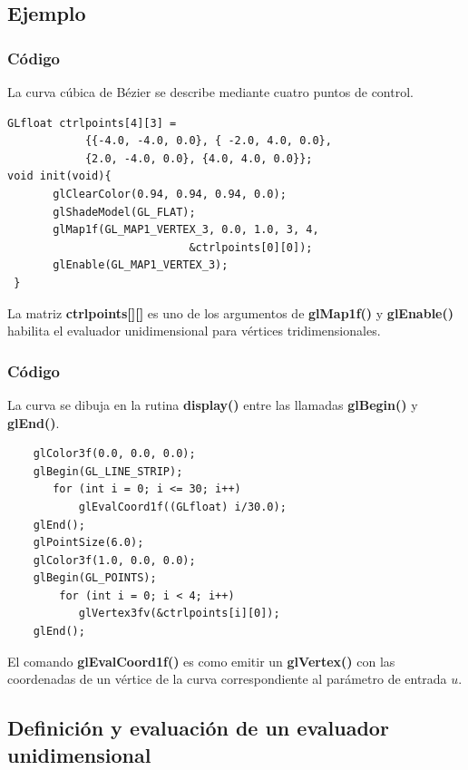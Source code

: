 \documentclass[10.5pt]{beamer}
\begin{document}
\subsection{Ejemplo}
\begin{frame}[fragile]
\justifying
\frametitle{Código}
La curva cúbica de Bézier se describe mediante cuatro puntos de control.
\begin{alertblock}{}
\small
\begin{verbatim}
GLfloat ctrlpoints[4][3] =
            {{-4.0, -4.0, 0.0}, { -2.0, 4.0, 0.0},
            {2.0, -4.0, 0.0}, {4.0, 4.0, 0.0}};
void init(void){
       glClearColor(0.94, 0.94, 0.94, 0.0);
       glShadeModel(GL_FLAT);
       glMap1f(GL_MAP1_VERTEX_3, 0.0, 1.0, 3, 4,
                            &ctrlpoints[0][0]);
       glEnable(GL_MAP1_VERTEX_3);
 }
\end{verbatim}
\end{alertblock}
La matriz \textbf{ctrlpoints[][]} es uno de los argumentos de \textbf{glMap1f()} y \textbf{glEnable()} habilita el evaluador unidimensional para vértices tridimensionales.
\end{frame}
\begin{frame}[fragile]
\frametitle{Código}
La curva se dibuja en la rutina \textbf{display()} entre las llamadas \textbf{glBegin()} y \textbf{glEnd()}.

\begin{alertblock}{}
\small
\begin{verbatim}
    glColor3f(0.0, 0.0, 0.0);
    glBegin(GL_LINE_STRIP);
       for (int i = 0; i <= 30; i++)
           glEvalCoord1f((GLfloat) i/30.0);
    glEnd();
    glPointSize(6.0);
    glColor3f(1.0, 0.0, 0.0);
    glBegin(GL_POINTS);
        for (int i = 0; i < 4; i++)
           glVertex3fv(&ctrlpoints[i][0]);
    glEnd();
\end{verbatim}
\end{alertblock}
El comando \textbf{glEvalCoord1f()} es como emitir un \textbf{glVertex()} con las coordenadas de un vértice de la curva correspondiente al parámetro de entrada $u$.
\end{frame}
\subsection{Definición y evaluación de un evaluador unidimensional}
\end{document}
